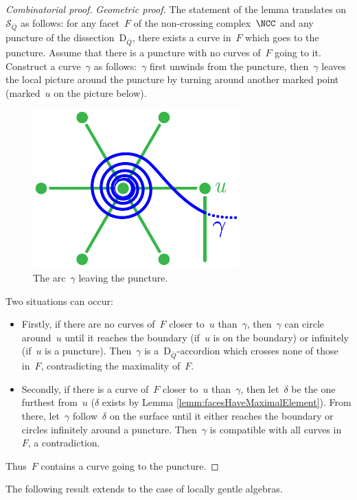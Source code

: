 \documentclass{amsart}
\theoremstyle{definition}
\newcommand{\para}[1]{\medskip\noindent\textit{#1.}} %
\newcommand{\surface}{\mathcal{S}} %
\newcommand{\dissection}{\mathrm{D}} %
\begin{document}
\begin{proof}[Combinatorial proof]
\para{Geometric proof}
The statement of the lemma translates on~$\surface_{\bar Q}$ as follows: for any facet~$F$ of the non-crossing complex~$\NCC$ and any puncture of the dissection~$\dissection_{\bar Q}$, there exists a curve in~$F$ which goes to the puncture.
Assume that there is a puncture with no curves of~$F$ going to it.
Construct a curve~$\gamma$ as follows:~$\gamma$ first unwinds from the puncture, then~$\gamma$ leaves the local picture around the puncture by turning around another marked point (marked~$u$ on the picture below).

\begin{figure}[h]
	\capstart
	\centerline{\includegraphics[scale=.7]{infiniteCurve1.pdf}}
	\caption{The arc~$\gamma$ leaving the puncture.}
	\label{fig:aroundPuncture2}
\end{figure}

Two situations can occur:
\begin{itemize}
\item Firstly, if there are no curves of~$F$ closer to~$u$ than~$\gamma$, then~$\gamma$ can circle around~$u$ until it reaches the boundary (if~$u$ is on the boundary) or infinitely (if~$u$ is a puncture).
Then~$\gamma$ is a~$\dissection_{\bar Q}$-accordion which crosses none of those in~$F$, contradicting the maximality of~$F$.
\item Secondly, if there is a curve of~$F$ closer to~$u$ than~$\gamma$, then let~$\delta$ be the one furthest from~$u$ ($\delta$ exists by Lemma \ref{lemm:facesHaveMaximalElement}).
From there, let~$\gamma$ follow~$\delta$ on the surface until it either reaches the boundary or circles infinitely around a puncture.  
Then~$\gamma$ is compatible with all curves in~$F$, a contradiction.
\end{itemize}
Thus~$F$ contains a curve going to the puncture.
\end{proof}

The following result extends \cite[Prop.~2.26]{PaluPilaudPlamondon} to the case of locally gentle algebras.
\end{document}
